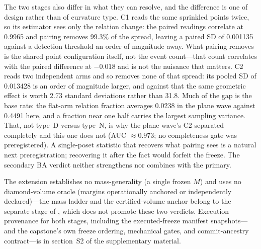 The two stages also differ in what they can resolve, and the
difference is one of design rather than of curvature type. C1 reads the same
sprinkled points twice, so its estimator sees only the relation change: the
paired readings correlate at 0.9965 and pairing removes 99.3\% of the spread,
leaving a paired SD of 0.001135 against a detection threshold an order of
magnitude away. What pairing removes is the shared point configuration
itself, not the event count---that count correlates with the paired
difference at $-0.018$ and is not the nuisance that matters. C2 reads two
independent arms and so removes none of that spread: its pooled SD of
0.013428 is an order of magnitude larger, and against that the same
geometric effect is worth 2.73 standard deviations rather than 31.8. Much
of the gap is the base rate: the flat-arm relation fraction averages
0.0238 in the plane wave against 0.4491 here, and a fraction near one half
carries the largest sampling variance. That, not type~D versus type~N, is
why the plane
wave's C2 separated completely and this one does not (AUC $\approx 0.973$; no
completeness gate was preregistered). A single-poset statistic that recovers
what pairing sees is a natural next preregistration; recovering it after the
fact would forfeit the freeze. The secondary
BA verdict neither strengthens nor combines with the primary.

The extension
establishes no mass-generality (a single frozen $M$) and uses no
diamond-volume oracle (margins operationally anchored or independently
declared)---the mass ladder and the certified-volume anchor belong to the
separate stage of , which does not promote these two
verdicts. Execution provenance for both stages, including the
executed-freeze manifest snapshots---and the capstone's own freeze
ordering, mechanical gates, and commit-ancestry contract---is in
section~S2 of the supplementary material.

